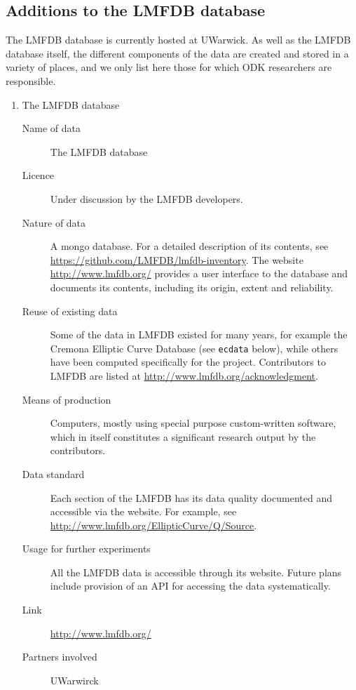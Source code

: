 \documentclass{deliverablereport}
\begin{document}
\subsection{Additions to the LMFDB database}

The LMFDB database is currently hosted at UWarwick.  As well as the LMFDB database itself, the different components of the data are created and stored in a variety of places, and we only list here those for which ODK researchers are responsible.

\begin{enumerate}

\item{The LMFDB database}
\begin{description}
\item[Name of data] The LMFDB database
\item[Licence]  Under discussion by the LMFDB developers.
\item[Nature of data] A mongo database.  For a detailed description of its contents, see \url{https://github.com/LMFDB/lmfdb-inventory}. The website \url{http://www.lmfdb.org/} provides a user interface to the database and documents its contents, including its origin, extent and reliability.
\item[Reuse of existing data] Some of the data in LMFDB existed for many years, for example the Cremona Elliptic Curve Database (see {\tt ecdata} below), while others have been computed specifically for the project.   Contributors to LMFDB are listed at \url{http://www.lmfdb.org/acknowledgment}.
\item[Means of production] Computers, mostly using special purpose custom-written software, which in itself constitutes a significant research output by the contributors.
\item[Data standard] Each section of the LMFDB has its data quality documented and accessible via the website.  For example, see  \url{http://www.lmfdb.org/EllipticCurve/Q/Source}.
\item [Usage for further experiments] All the LMFDB data is accessible through its website.  Future plans include provision of an API for accessing the data systematically.
\item [Link]  \url{http://www.lmfdb.org/}
\item[Partners involved] UWarwirck
\end{description}


\end{enumerate}
\end{document}
